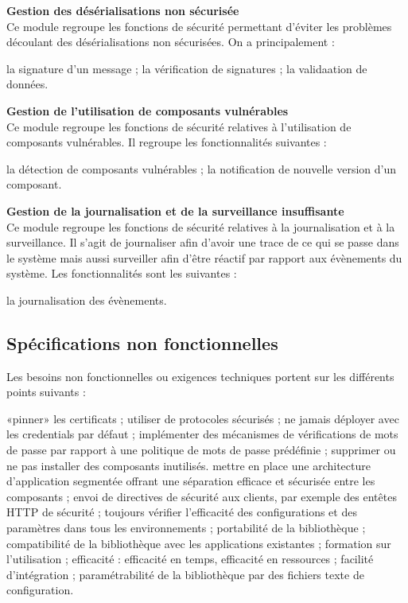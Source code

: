 \textbf{\RIGHTarrow Gestion des désérialisations non sécurisée}\\
Ce module regroupe les fonctions de sécurité permettant d'éviter les problèmes découlant des désérialisations non sécurisées. On a principalement :
\begin{itemize}
	\itemcheck la signature d'un message ;
	\itemcheck la vérification de signatures ; 
	\itemcheck la validaation de données.\\
\end{itemize}

\textbf{\RIGHTarrow Gestion de l'utilisation de composants vulnérables}\\
Ce module regroupe les fonctions de sécurité relatives à l'utilisation de composants vulnérables. Il regroupe les fonctionnalités suivantes :
\begin{itemize}
	\itemcheck la détection de composants vulnérables ;
	\itemcheck la notification de nouvelle version d'un composant.\\
\end{itemize}

\textbf{\RIGHTarrow Gestion de la journalisation et de la surveillance insuffisante}\\
Ce module regroupe les fonctions de sécurité relatives à la journalisation et à la surveillance. Il s'agit de journaliser afin d'avoir une trace de ce qui se passe dans le système mais aussi surveiller afin d'être réactif par rapport aux évènements du système. Les fonctionnalités sont les suivantes :
\begin{itemize}
	\itemcheck la journalisation des évènements.
\end{itemize}

\subsection{Spécifications non fonctionnelles}
Les besoins non fonctionnelles ou exigences techniques portent sur les différents points suivants :
\begin{itemize}
	\itemcheck «pinner» les certificats ; 
	\itemcheck utiliser de protocoles sécurisés ;
	\itemcheck ne jamais déployer avec les credentials par défaut ;
	\itemcheck implémenter des mécanismes de vérifications de mots de passe par rapport à une politique de mots de passe prédéfinie ;
	\itemcheck supprimer ou ne pas installer des composants inutilisés.
	\itemcheck mettre en place une architecture d'application segmentée offrant une séparation efficace et sécurisée entre les composants ;
	\itemcheck envoi de directives de sécurité aux clients, par exemple des entêtes HTTP de sécurité ;
	\itemcheck toujours vérifier l'efficacité des configurations et des paramètres dans tous les environnements ;
	\itemcheck portabilité de la bibliothèque ;
	\itemcheck compatibilité de la bibliothèque avec les applications existantes ;
	\itemcheck formation sur l'utilisation ;
	\itemcheck efficacité : efficacité en temps, efficacité en ressources ;
	\itemcheck facilité d'intégration ;
	\itemcheck paramétrabilité de la bibliothèque par des fichiers texte de configuration.
\end{itemize}

